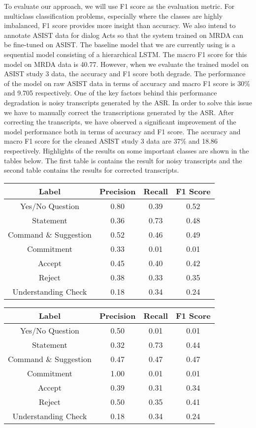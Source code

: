 To evaluate our approach, we will use F1 score as the evaluation metric. For
multiclass classification problems, especially where the classes are highly
imbalanced, F1 score provides more insight than accuracy.  We also intend to
annotate ASIST data for dialog Acts so that the system trained on MRDA can be
fine-tuned on ASIST. The baseline model that we are currently using is a sequential
model consisting of a hierarchical LSTM. The macro F1 score for this model on MRDA
data is 40.77. However, when we evaluate the trained model on ASIST study 3 data, 
the accuracy and F1 score both degrade. The performance of the model on raw ASIST
data in terms of accuracy and macro F1 score is 30\% and 9.705 respectively. 
One of the key factors behind this performance degradation is noisy transcripts 
generated by the ASR. In order to solve this issue we have to manually correct the
transcriptions generated by the ASR. After correcting the transcripts, we have
observed a significant improvement of the model performance both in terms of accuracy
and F1 score. The accuracy and macro F1 score for the cleaned ASIST study 3 data are 
37\% and 18.86 respectively. Highlights of the results on some important classes are 
shown in the tables below. The first table is contains the result for noisy transcripts 
and the second table contains the results for corrected transcripts.

\begin{center}
\begin{tabular}{||c c c c||}
 \hline
 Label & Precision & Recall & F1 Score\\ [0.5ex]
 \hline\hline
 Yes/No Question & 0.80 & 0.39  & 0.52\\
 \hline
 Statement & 0.36 & 0.73 & 0.48\\
 \hline
 Command \& Suggestion & 0.52 & 0.46 & 0.49\\
 \hline
 Commitment & 0.33 & 0.01 & 0.01\\
 \hline
 Accept & 0.45 & 0.40 &  0.42 \\
 \hline
  Reject & 0.38 & 0.33 & 0.35\\
 \hline
  Understanding Check & 0.18 & 0.34 & 0.24\\
 \hline
\end{tabular}
\end{center}

\begin{center}
\begin{tabular}{||c c c c||}
 \hline
 Label & Precision & Recall & F1 Score\\ [0.5ex]
 \hline\hline
 Yes/No Question & 0.50 & 0.01 & 0.01\\
 \hline
 Statement & 0.32 & 0.73 & 0.44\\
 \hline
 Command \& Suggestion & 0.47 & 0.47 & 0.47\\
 \hline
 Commitment & 1.00 & 0.01 & 0.01\\
 \hline
 Accept & 0.39 & 0.31 &  0.34 \\
 \hline
  Reject & 0.50 & 0.35 & 0.41\\
 \hline
  Understanding Check & 0.18 & 0.34 & 0.24\\
 \hline
\end{tabular}
\end{center}

